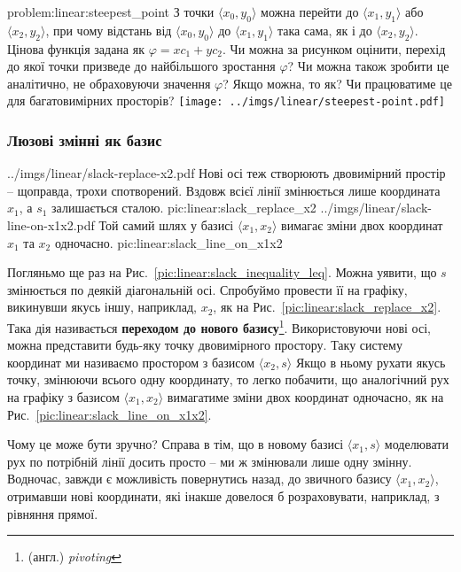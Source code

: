 \documentclass[\main/book.tex]{subfiles}
\begin{document}
\begin{problem}{problem:linear:steepest_point}
 З точки $\langle x_0, y_0 \rangle$ можна перейти до $\langle x_1, y_1 \rangle$ або $\langle x_2, y_2 \rangle$, при чому відстань від $\langle x_0,y_0 \rangle$ до $\langle x_1,y_1 \rangle$ така сама, як і до $\langle x_2,y_2 \rangle$. Цінова функція задана як $\varphi = x c_1 + y c_2$. Чи можна за рисунком оцінити, перехід до якої точки призведе до найбільшого зростання $\varphi$? Чи можна також зробити це аналітично, не обраховуючи значення $\varphi$? Якщо можна, то як? Чи працюватиме це для багатовимірних просторів?
 \center
 \texttt{[image: ../imgs/linear/steepest-point.pdf]}
\end{problem}

\subsubsection{Люзові змінні як базис}

\twocolminipage
 {
  \nofigillustration
   {../imgs/linear/slack-replace-x2.pdf}
   {Нові осі теж створюють двовимірний простір -- щоправда, трохи \flqq{}спотворений\frqq. Вздовж всієї лінії змінюється лише координата $x_1$, а $s_1$ залишається сталою.}
   {pic:linear:slack_replace_x2}
 }{
  \nofigillustration
   {../imgs/linear/slack-line-on-x1x2.pdf}
   {Той самий шлях у базисі ${\langle x_1, x_2 \rangle}$ вимагає зміни двох координат $x_1$ та $x_2$ одночасно.}
   {pic:linear:slack_line_on_x1x2}
 }

Погляньмо ще раз на Рис.~\ref{pic:linear:slack_inequality_leq}. Можна уявити, що $s$ змінюється по деякій діагональній осі. Спробуймо провести її на графіку, викинувши якусь іншу, наприклад, $x_2$, як на Рис.~\ref{pic:linear:slack_replace_x2}. Така дія називається \textbf{переходом до нового базису}\footnote{(англ.) \textit{pivoting}}. Використовуючи нові осі, можна представити будь-яку точку двовимірного простору. Таку систему координат ми називаємо \flqq{}простором з базисом ${\langle x_2, s \rangle}$\frqq{} Якщо в ньому рухати якусь точку, змінюючи всього одну координату, то легко побачити, що аналогічний рух на графіку з базисом ${\langle x_1, x_2 \rangle}$ вимагатиме зміни двох координат одночасно, як на Рис.~\ref{pic:linear:slack_line_on_x1x2}.

Чому це може бути зручно? Справа в тім, що в новому базисі ${\langle x_1, s \rangle}$ моделювати рух по потрібній лінії досить просто -- ми ж змінювали лише одну змінну. Водночас, завжди є можливість повернутись назад, до звичного базису ${\langle x_1, x_2 \rangle}$, отримавши нові координати, які інакше довелося б розраховувати, наприклад, з рівняння прямої.
\end{document}
